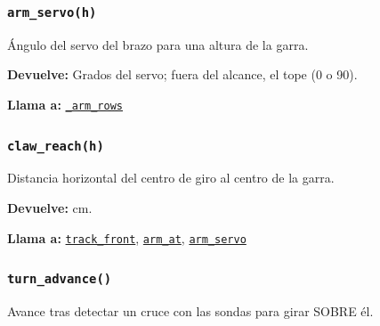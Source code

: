 \subsubsection{\texttt{arm\_\allowbreak{}servo(h)}}\label{fn:geometry:arm-servo}
\noindent Ángulo del servo del brazo para una altura de la garra.

\par{}\par\smallskip
\noindent\textbf{Devuelve:} Grados del servo; fuera del alcance, el tope (0 o 90).\par
\noindent\textbf{Llama a:} \hyperref[fn:geometry:-arm-rows]{\texttt{\_\allowbreak{}arm\_\allowbreak{}rows}}\par

\subsubsection{\texttt{claw\_\allowbreak{}reach(h)}}\label{fn:geometry:claw-reach}
\noindent Distancia horizontal del centro de giro al centro de la garra.

\par{}\par\smallskip
\noindent\textbf{Devuelve:} cm.\par
\noindent\textbf{Llama a:} \hyperref[fn:geometry:track-front]{\texttt{track\_\allowbreak{}front}}, \hyperref[fn:geometry:arm-at]{\texttt{arm\_\allowbreak{}at}}, \hyperref[fn:geometry:arm-servo]{\texttt{arm\_\allowbreak{}servo}}\par

\subsubsection{\texttt{turn\_\allowbreak{}advance()}}\label{fn:geometry:turn-advance}
\noindent Avance tras detectar un cruce con las sondas para girar SOBRE él.

